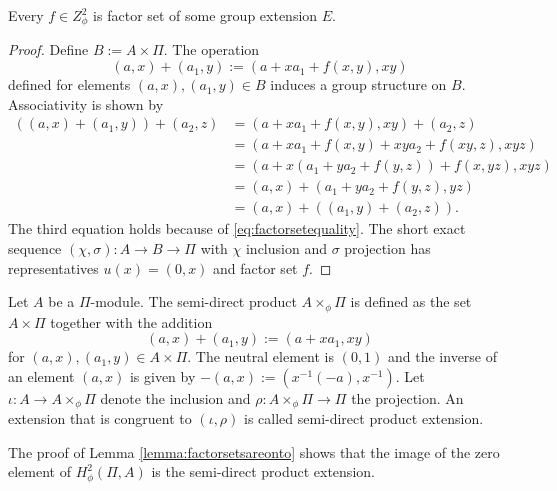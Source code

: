 \begin{lemma}
\label{lemma:factorsetsareonto}
Every $f\in Z_\phi^2$ is factor set of some group extension $E$.
\end{lemma}
\begin{proof}
Define $B:=A\times\Pi$.
The operation 
\[
(a,x)+(a_1,y) := (a+x a_1+f(x,y),xy)
\]
defined for elements $(a,x), (a_1,y)\in B$ induces a group structure on $B$.
Associativity is shown by
\begin{align*}
((a,x)+(a_1,y))+(a_2,z) 
&= (a+x a_1+f(x,y),xy) + (a_2,z)\\
&= (a+x a_1+f(x,y) + xya_2 + f(xy,z),xyz)\\
&=(a+x(a_1+y a_2+f(y,z))+f(x,yz),xyz) \\
&=(a,x)+(a_1+y a_2+f(y,z),yz)\\
&=(a,x)+((a_1,y)+(a_2,z)).
\end{align*}
The third equation holds because of \eqref{eq:factorsetequality}.
The short exact sequence $(\chi,\sigma): A\to B\to\Pi$ with $\chi$ inclusion and $\sigma$ projection has representatives $u(x)=(0,x)$ and factor set $f$.
\end{proof}

Let $A$ be a $\Pi$-module.
The semi-direct product $A\times_\phi \Pi$ is defined as the set $A\times\Pi$ together with the addition
\[
(a,x)+(a_1,y) := (a + x a_1, x y) 
\]
for $(a,x), (a_1,y) \in A\times \Pi$.
The neutral element is $(0,1)$ and the inverse of an element $(a,x)$ is given by $-(a,x):=(x^{-1}(-a),x^{-1})$.
Let $\iota:A \to A \times_\phi \Pi$ denote the inclusion and $\rho:A \times_\phi \Pi \to \Pi$ the projection.
An extension that is congruent to $(\iota, \rho)$ is called semi-direct product extension.

The proof of Lemma \ref{lemma:factorsetsareonto} shows that the image of the zero element of $H_\phi^2(\Pi,A)$ is the semi-direct product extension.